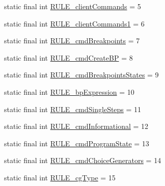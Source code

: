 \begin{DoxyCompactItemize}
\item 
static final int \hyperlink{classgov_1_1nasa_1_1jpf_1_1inspector_1_1client_1_1parser_1_1_console_grammar_parser_a4ab50e25114c9fcfe3f4620d96a6fcf0}{R\+U\+L\+E\+\_\+client\+Commands} = 5
\item 
static final int \hyperlink{classgov_1_1nasa_1_1jpf_1_1inspector_1_1client_1_1parser_1_1_console_grammar_parser_acdbea81112f16d62575bddef3a9f3753}{R\+U\+L\+E\+\_\+client\+Commands1} = 6
\item 
static final int \hyperlink{classgov_1_1nasa_1_1jpf_1_1inspector_1_1client_1_1parser_1_1_console_grammar_parser_acd476ae23e4958e581fc2725c12b8e16}{R\+U\+L\+E\+\_\+cmd\+Breakpoints} = 7
\item 
static final int \hyperlink{classgov_1_1nasa_1_1jpf_1_1inspector_1_1client_1_1parser_1_1_console_grammar_parser_adcd00347d444860a63ce228176300425}{R\+U\+L\+E\+\_\+cmd\+Create\+BP} = 8
\item 
static final int \hyperlink{classgov_1_1nasa_1_1jpf_1_1inspector_1_1client_1_1parser_1_1_console_grammar_parser_a8609514a3f626ea2e7dd47fc626e3533}{R\+U\+L\+E\+\_\+cmd\+Breakpoints\+States} = 9
\item 
static final int \hyperlink{classgov_1_1nasa_1_1jpf_1_1inspector_1_1client_1_1parser_1_1_console_grammar_parser_aae3e03dda644ab34f4823952cfe0b332}{R\+U\+L\+E\+\_\+bp\+Expression} = 10
\item 
static final int \hyperlink{classgov_1_1nasa_1_1jpf_1_1inspector_1_1client_1_1parser_1_1_console_grammar_parser_a6c48a7ddf131fb88e1750b2c41f97f78}{R\+U\+L\+E\+\_\+cmd\+Single\+Steps} = 11
\item 
static final int \hyperlink{classgov_1_1nasa_1_1jpf_1_1inspector_1_1client_1_1parser_1_1_console_grammar_parser_a78d3427edac720088893ec8a539df535}{R\+U\+L\+E\+\_\+cmd\+Informational} = 12
\item 
static final int \hyperlink{classgov_1_1nasa_1_1jpf_1_1inspector_1_1client_1_1parser_1_1_console_grammar_parser_a1c1e3ab45ed4919c0562ba9b62c9c846}{R\+U\+L\+E\+\_\+cmd\+Program\+State} = 13
\item 
static final int \hyperlink{classgov_1_1nasa_1_1jpf_1_1inspector_1_1client_1_1parser_1_1_console_grammar_parser_a49dd74d91ddf88f49df828ae49bf06e9}{R\+U\+L\+E\+\_\+cmd\+Choice\+Generators} = 14
\item 
static final int \hyperlink{classgov_1_1nasa_1_1jpf_1_1inspector_1_1client_1_1parser_1_1_console_grammar_parser_aeba14a287ed4bbd2dac0b25b2caf2c21}{R\+U\+L\+E\+\_\+cg\+Type} = 15
\item 

\end{DoxyCompactItemize}
